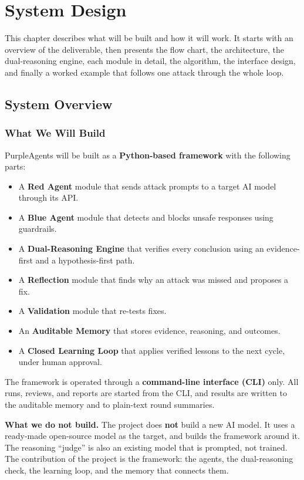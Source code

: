 \chapter{System Design}
\label{ch:design}

This chapter describes what will be built and how it will work. It starts with
an overview of the deliverable, then presents the flow chart, the architecture,
the dual-reasoning engine, each module in detail, the algorithm, the interface
design, and finally a worked example that follows one attack through the whole
loop.

\section{System Overview}

\subsection{What We Will Build}

PurpleAgents will be built as a \textbf{Python-based framework} with the
following parts:

\begin{itemize}
  \item A \textbf{Red Agent} module that sends attack prompts to a target AI
  model through its API.
  \item A \textbf{Blue Agent} module that detects and blocks unsafe responses
  using guardrails.
  \item A \textbf{Dual-Reasoning Engine} that verifies every conclusion using an
  evidence-first and a hypothesis-first path.
  \item A \textbf{Reflection} module that finds why an attack was missed and
  proposes a fix.
  \item A \textbf{Validation} module that re-tests fixes.
  \item An \textbf{Auditable Memory} that stores evidence, reasoning, and
  outcomes.
  \item A \textbf{Closed Learning Loop} that applies verified lessons to the next
  cycle, under human approval.
\end{itemize}

The framework is operated through a \textbf{command-line interface (CLI)} only.
All runs, reviews, and reports are started from the CLI, and results are written
to the auditable memory and to plain-text round summaries.

\medskip
\noindent\textbf{What we do not build.} The project does \textbf{not} build a new
AI model. It uses a ready-made open-source model as the target, and builds the
framework around it. The reasoning ``judge'' is also an existing model that is
prompted, not trained. The contribution of the project is the framework: the
agents, the dual-reasoning check, the learning loop, and the memory that connects
them.

